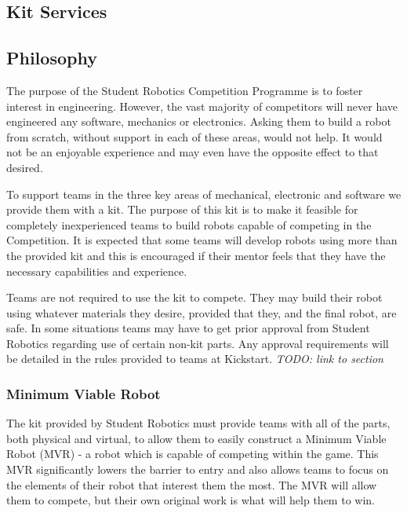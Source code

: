 \begin{draft}
\section{Kit Services}

\subsection{Philosophy}

The purpose of the Student Robotics Competition Programme is to foster interest in engineering. However, the vast majority of competitors will never have engineered any software, mechanics or electronics. Asking them to build a robot from scratch, without support in each of these areas, would not help. It would not be an enjoyable experience and may even have the opposite effect to that desired.

To support teams in the three key areas of mechanical, electronic and software we provide them with a kit. The purpose of this kit is to make it feasible for completely inexperienced teams to build robots capable of competing in the Competition. It is expected that some teams will develop robots using more than the provided kit and this is encouraged if their mentor feels that they have the necessary capabilities and experience.

Teams are not required to use the kit to compete. They may build their robot using whatever materials they desire, provided that they, and the final robot, are safe. In some situations teams may have to get prior approval from Student Robotics regarding use of certain non-kit parts. Any approval requirements will be detailed in the rules provided to teams at Kickstart. \emph{TODO: link to section}

\subsubsection{Minimum Viable Robot}

The kit provided by Student Robotics must provide teams with all of the parts, both physical and virtual, to allow them to easily construct a Minimum Viable Robot (MVR) - a robot which is capable of competing within the game. This MVR significantly lowers the barrier to entry and also allows teams to focus on the elements of their robot that interest them the most. The MVR will allow them to compete, but their own original work is what will help them to win.


\end{draft}
